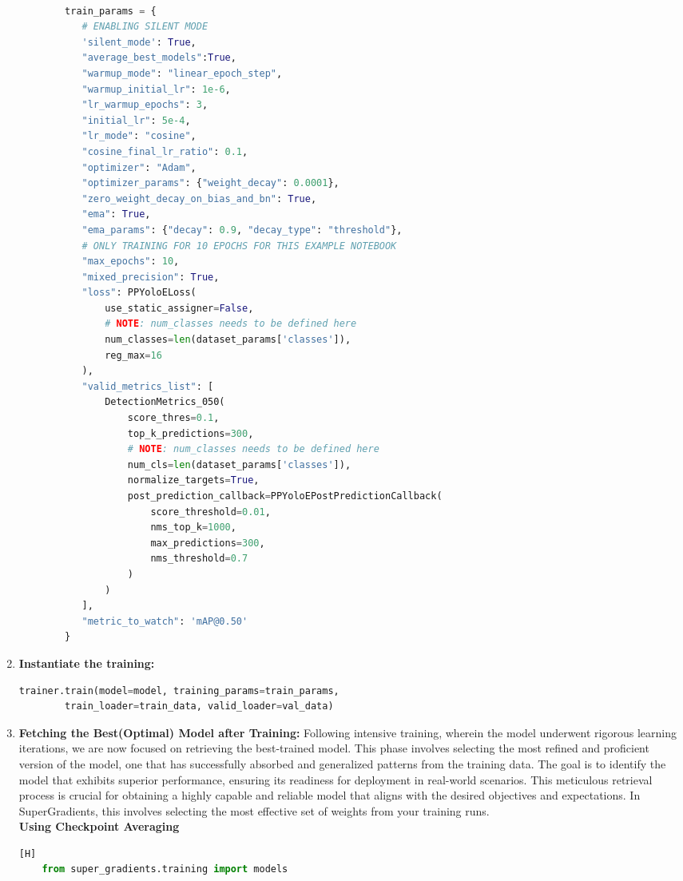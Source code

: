 \begin{enumerate}
\begin{lstlisting}[language=Python]
        
        train_params = {
           # ENABLING SILENT MODE
           'silent_mode': True,
           "average_best_models":True,
           "warmup_mode": "linear_epoch_step",
           "warmup_initial_lr": 1e-6,
           "lr_warmup_epochs": 3,
           "initial_lr": 5e-4,
           "lr_mode": "cosine",
           "cosine_final_lr_ratio": 0.1,
           "optimizer": "Adam",
           "optimizer_params": {"weight_decay": 0.0001},
           "zero_weight_decay_on_bias_and_bn": True,
           "ema": True,
           "ema_params": {"decay": 0.9, "decay_type": "threshold"},
           # ONLY TRAINING FOR 10 EPOCHS FOR THIS EXAMPLE NOTEBOOK
           "max_epochs": 10,
           "mixed_precision": True,
           "loss": PPYoloELoss(
               use_static_assigner=False,
               # NOTE: num_classes needs to be defined here
               num_classes=len(dataset_params['classes']),
               reg_max=16
           ),
           "valid_metrics_list": [
               DetectionMetrics_050(
                   score_thres=0.1,
                   top_k_predictions=300,
                   # NOTE: num_classes needs to be defined here
                   num_cls=len(dataset_params['classes']),
                   normalize_targets=True,
                   post_prediction_callback=PPYoloEPostPredictionCallback(
                       score_threshold=0.01,
                       nms_top_k=1000,
                       max_predictions=300,
                       nms_threshold=0.7
                   )
               )
           ],
           "metric_to_watch": 'mAP@0.50'
        }
    \end{lstlisting}
    \item \textbf{Instantiate the training: }
    \begin{lstlisting}[language=Python, caption=Commencing the Training, escapeinside=``]
        trainer.train(model=model, training_params=train_params,
        train_loader=train_data, valid_loader=val_data)
    \end{lstlisting}
    \item \textbf{ Fetching the Best(Optimal) Model after Training: } Following intensive training, wherein the model underwent rigorous learning iterations, we are now focused on retrieving the best-trained model. This phase involves selecting the most refined and proficient version of the model, one that has successfully absorbed and generalized patterns from the training data. The goal is to identify the model that exhibits superior performance, ensuring its readiness for deployment in real-world scenarios. This meticulous retrieval process is crucial for obtaining a highly capable and reliable model that aligns with the desired objectives and expectations. In SuperGradients, this involves selecting the most effective set of weights from your training runs.\\
    \textbf{Using Checkpoint Averaging}
    \begin{addmargin}[8mm]{0mm}
    \footnotesize
    \begin{lstlisting}[language=Python, caption=Load trained model][H]
    from super_gradients.training import models


\end{lstlisting}
\end{addmargin}
\end{enumerate}
